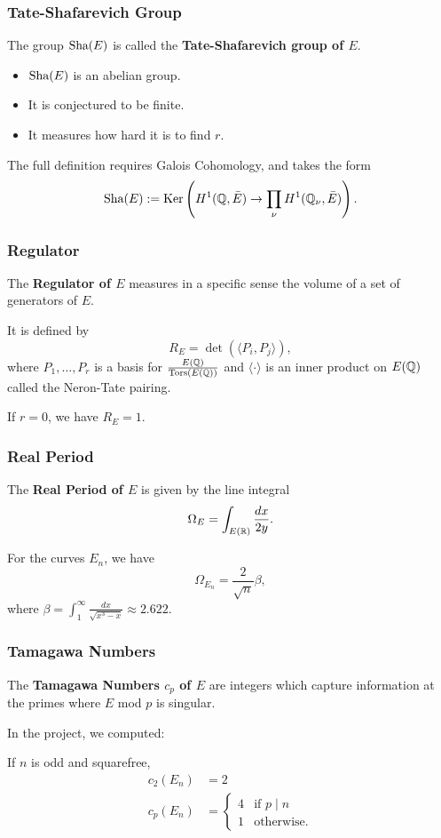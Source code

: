 \documentclass{beamer}
\begin{document}
\begin{frame}
  \frametitle{Tate-Shafarevich Group}
  The group $\text{\normalfont Sha}(E)$ is called the \textbf{Tate-Shafarevich group of $E$}.
  \begin{itemize}
  \item $\text{\normalfont Sha}(E)$ is an abelian group.
  \item It is conjectured to be finite.
  \item It measures how hard it is to find $r$. 
  \end{itemize} \pause
  \bigskip
  
  The full definition requires Galois Cohomology, and takes the
  form
  \[\text{\normalfont Sha}(E) := \textnormal{Ker} \left( H^1({\mathbb Q},\bar{E}) \rightarrow \prod\limits_\nu
    H^1({\mathbb Q}_\nu, \bar{E})\right).\]
\end{frame}

\begin{frame}
  \frametitle{Regulator}
  The \textbf{Regulator of $E$} measures in a specific sense the volume of a set
  of generators of $E$. \pause
  \bigskip

  It is defined by
  \[R_E = \det \left( \langle P_i, P_j \rangle \right),\]
  where $P_1, \dots, P_r$ is a basis for $\frac{E({\mathbb Q})}{{\text{\normalfont Tors}}(E({\mathbb Q}))}$ and
  $\langle \cdot \rangle$ is an inner product on $E({\mathbb Q})$ called the Neron-Tate
  pairing. 
  \bigskip

  If $r = 0$, we have $R_E = 1.$
\end{frame}

\begin{frame}
  \frametitle{Real Period}
  The \textbf{Real Period of $E$} is given by the line integral
  \[\Omega_E = \int_{E({\mathbb R})} \frac{dx}{2y}.\] \pause

  For the curves $E_n$, we have
  \[\Omega_{E_n} = \frac{2}{\sqrt{n}} \beta,\]
  where $\beta = \int_1^\infty \frac{dx}{\sqrt{x^3-x}} \approx 2.622.$
\end{frame}

\begin{frame}
  \frametitle{Tamagawa Numbers}
  The \textbf{Tamagawa Numbers $c_p$ of $E$} are integers which
  capture information at the primes
  where $E$ mod $p$ is singular. \pause
  \bigskip

  In the project, we computed:
  \begin{theorem}
    If $n$ is odd and squarefree,
    \[ \begin{split} c_2(E_n) &= 2 \\
    c_p(E_n) &=
      \begin{cases}
        4 &\text{if } p \mid n \\
        1 &\text{otherwise}.
      \end{cases}
    \end{split}\]
  \end{theorem}

\end{frame}
\end{document}
